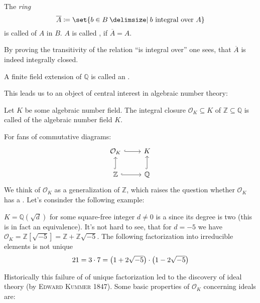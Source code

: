 \begin{definition}[{name=[integral closure]}]
	The \emph{ring}
	\[
		\overline{A} \coloneqq \set{b \in B \given b \text{ integral over }A}
	\]
	is called  of $A$ in $B$.
	$A$ is called , if $\overline{A} = A$.
\end{definition}

By proving the transitivity of the relation \enquote{is integral over} one sees, that $\overline{A}$ is indeed integrally closed.

\begin{definition}[{name=[algebraic number field]}]
	A finite field extension of $\mathbb{Q}$ is called an .
\end{definition}

This leads us to an object of central interest in algebraic number theory:

\begin{definition}[{name=[ring of integers]}]
	Let $K$ be some algebraic number field.
	The integral closure $\mathcal{O}_K \subseteq K$ of $\mathbb{Z} \subseteq \mathbb{Q}$ is called  of the algebraic number field $K$.
\end{definition}

For fans of commutative diagrams:
\[
	\begin{tikzcd}
		\mathcal{O}_K \rar[hook] & K \\
		\mathbb{Z} \uar[hook] \rar[hook] & \mathbb{Q} \uar[hook]
	\end{tikzcd}
\]
We think of $\mathcal{O}_K$ as a generalization of $\mathbb{Z}$, which raises the question whether $\mathcal{O}_K$ has a . Let's consinder the following example:

\begin{example}
	$K=\mathbb{Q}(\sqrt{d})$ for some square-free integer $d \neq 0$ is a  since its degree is two (this is in fact an equivalence).
	It's not hard to see, that for $d=-5$ we have $\mathcal{O}_K = \mathbb{Z}[\sqrt{-5}] = \mathbb{Z} + \mathbb{Z}\sqrt{-5}$.
	The following factorization into irreducible elements is not unique
	\[
		21 = 3 \cdot 7 = \enbrace*{1+ 2 \sqrt{-5}} \cdot \enbrace*{1 - 2 \sqrt{-5}}
	\]
\end{example}

Historically this failure of of unique factorization led to the discovery of ideal theory (by \textsc{Edward Kummer} 1847).
Some basic properties of $\mathcal{O}_K$ concerning ideals are:

